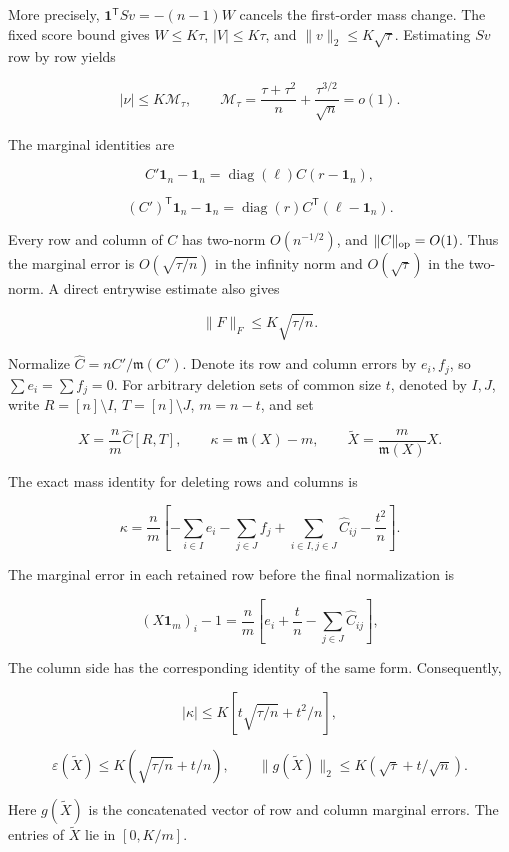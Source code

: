 \documentclass[11pt,a4paper]{article}
\begin{document}
More precisely, \(\mathbf 1^{\mathsf T}Sv=-(n-1)W\) cancels the first-order mass change. The fixed score bound gives \(W\le K\tau\), \(|V|\le K\tau\), and \(\|v\|_2\le K\sqrt\tau\). Estimating \(Sv\) row by row yields

\[
|\nu|\le K\mathcal M_\tau,\qquad \mathcal M_\tau=\frac{\tau+\tau^2}{n}+\frac{\tau^{3/2}}{\sqrt n}=o(1).
\]

The marginal identities are

\[
C'\mathbf 1_n-\mathbf 1_n=\operatorname{diag}(\ell)C(r-\mathbf 1_n),
\]

\[
(C')^{\mathsf T}\mathbf 1_n-\mathbf 1_n=\operatorname{diag}(r)C^{\mathsf T}(\ell-\mathbf 1_n).
\]

Every row and column of \(C\) has two-norm \(O(n^{-1/2})\), and \(\|C\|_{\rm op}=O(1)\). Thus the marginal error is \(O(\sqrt{\tau/n})\) in the infinity norm and \(O(\sqrt\tau)\) in the two-norm. A direct entrywise estimate also gives

\[
\|F\|_F\le K\sqrt{\tau/n}.
\]

Normalize \(\widehat C=nC'/\mathfrak m(C')\). Denote its row and column errors by \(e_i,f_j\), so \(\sum e_i=\sum f_j=0\). For arbitrary deletion sets of common size \(t\), denoted by \(I,J\), write \(R=[n]\setminus I\), \(T=[n]\setminus J\), \(m=n-t\), and set

\[
X=\frac n m\widehat C[R,T],\qquad \kappa=\mathfrak m(X)-m,\qquad \widetilde X=\frac m{\mathfrak m(X)}X.
\]

The exact mass identity for deleting rows and columns is

\begin{equation}
\kappa=\frac n m\left[-\sum_{i\in I}e_i-\sum_{j\in J}f_j+\sum_{i\in I,j\in J}\widehat C_{ij}-\frac{t^2}{n}\right].
\tag{4.1}
\label{eq-deletion-mass}
\end{equation}

The marginal error in each retained row before the final normalization is

\[
(X\mathbf 1_m)_i-1=\frac n m\left[e_i+\frac t n-\sum_{j\in J}\widehat C_{ij}\right],
\]

The column side has the corresponding identity of the same form. Consequently,

\[
|\kappa|\le K\left[t\sqrt{\tau/n}+t^2/n\right],
\]

\[
\varepsilon(\widetilde X)\le K(\sqrt{\tau/n}+t/n),\qquad \|g(\widetilde X)\|_2\le K(\sqrt\tau+t/\sqrt n).
\]

Here \(g(\widetilde X)\) is the concatenated vector of row and column marginal errors. The entries of \(\widetilde X\) lie in \([0,K/m]\).
\end{document}
